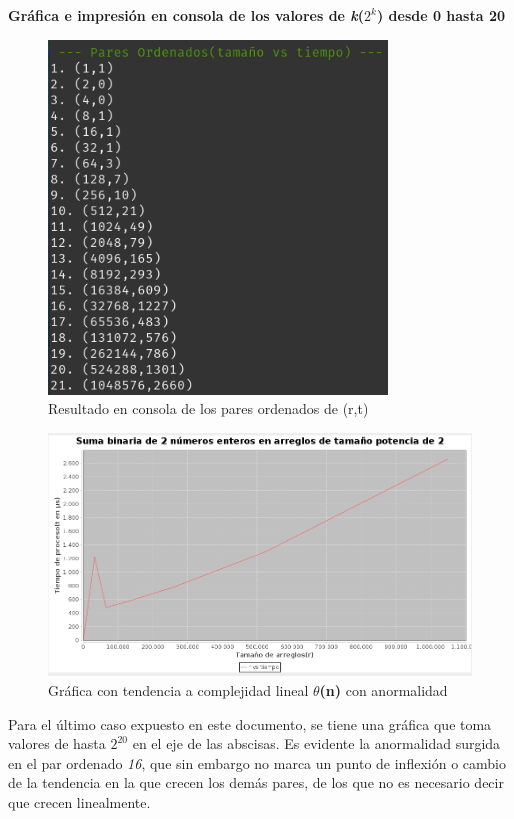 \documentclass{report}
\begin{document}
\begin{center}
            \textbf{Gráfica e impresión en consola de los valores de \textit{k}($2^k$) desde 0 hasta 20}
                
            \begin{figure}[!h]
            	\centering
            	\includegraphics[width=9cm]{Imagenes/Binarios-R-3.png}
                \caption{Resultado en consola de los pares ordenados de (r,t)}
            \end{figure}
            
            \begin{figure}[!h]
            	\centering
            	\includegraphics[width=15cm]{Imagenes/Binarios-G-3.png}
                \caption{Gráfica con tendencia a complejidad lineal \textbf{$\theta$(n)} con anormalidad}
            \end{figure}
            
            Para el último caso expuesto en este documento, se tiene una gráfica que toma valores de hasta $2^{20}$ en el eje de las abscisas. Es evidente la anormalidad surgida en el par ordenado \textit{16}, que sin embargo no marca un punto de inflexión o cambio de la tendencia en la que crecen los demás pares, de los que no es necesario decir que crecen linealmente.
            

\end{center}
\end{document}
